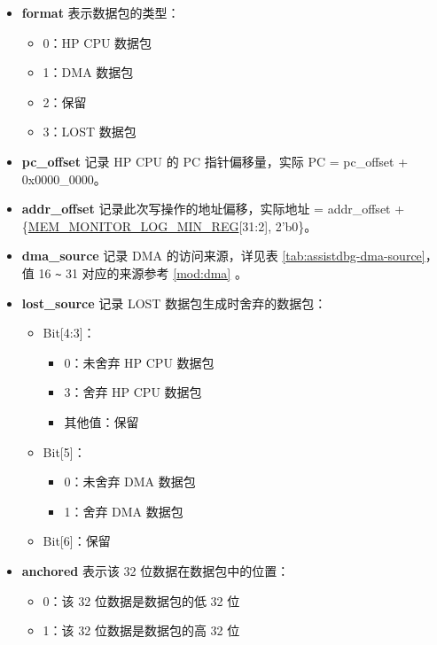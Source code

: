 \documentclass[main\_\_CN.tex]{subfiles}
\begin{document}
    \begin{itemize}
    \item \textbf{format} 表示数据包的类型：
\begin{itemize}
    \item 0：HP CPU 数据包
    \item 1：DMA 数据包
    \item 2：保留
    \item 3：LOST 数据包
\end{itemize}
\item \textbf{pc\_offset} 记录 HP CPU 的 PC 指针偏移量，实际 PC = pc\_offset + 0x0000\_0000。
\item \textbf{addr\_offset} 记录此次写操作的地址偏移，实际地址 = addr\_offset + \{\hyperref[regdesc:MEMMONITORLOGMINREG]{MEM\_MONITOR\_LOG\_MIN\_REG}[31:2], 2'b0\}。
\item \textbf{dma\_source} 记录 DMA 的访问来源，详见表 \ref{tab:assistdbg-dma-source}，值 16 \verb+~+ 31 对应的来源参考 \ref{mod:dma} \textit{}。
\item \textbf{lost\_source} 记录 LOST 数据包生成时舍弃的数据包：
\begin{itemize}
    \item Bit[4:3]：
    \begin{itemize}
        \item 0：未舍弃 HP CPU 数据包
        \item 3：舍弃 HP CPU 数据包
        \item 其他值：保留
    \end{itemize}
    \item Bit[5]：
    \begin{itemize}
        \item 0：未舍弃 DMA 数据包
        \item 1：舍弃 DMA 数据包
    \end{itemize}
    \item Bit[6]：保留
\end{itemize}
\item \textbf{anchored} 表示该 32 位数据在数据包中的位置：
\begin{itemize}
    \item 0：该 32 位数据是数据包的低 32 位
    \item 1：该 32 位数据是数据包的高 32 位
\end{itemize}
\end{itemize}
\end{document}
